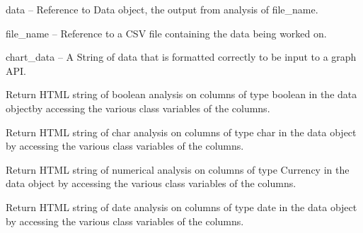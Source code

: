 \documentclass[letterpaper,10pt,english]{sphinxmanual}
\begin{document}
\begin{fulllineitems}
\begin{description}
data -- Reference to Data object, the output from analysis of file\_name.

file\_name -- Reference to a CSV file containing the data being worked on.

chart\_data -- A String of data that is formatted correctly to be input to a graph API.

\end{description}

\begin{fulllineitems}
\label{Code_rst/rep:report.Report.boolean_analysis}
Return HTML string of boolean analysis on columns of type boolean
in the data objectby accessing the various class variables of the
columns.

\end{fulllineitems}


\begin{fulllineitems}
\label{Code_rst/rep:report.Report.char_analysis}
Return HTML string of char analysis on columns of type char 
in the data object by accessing the various class variables of the
columns.

\end{fulllineitems}


\begin{fulllineitems}
\label{Code_rst/rep:report.Report.currency_analysis}
Return HTML string of numerical analysis on columns of type Currency
in the data object by accessing the various class variables of the
columns.

\end{fulllineitems}


\begin{fulllineitems}
\label{Code_rst/rep:report.Report.date_analysis}
Return HTML string of date analysis on columns of type date 
in the data object by accessing the various class variables of the
columns.

\end{fulllineitems}


\end{fulllineitems}
\end{document}
